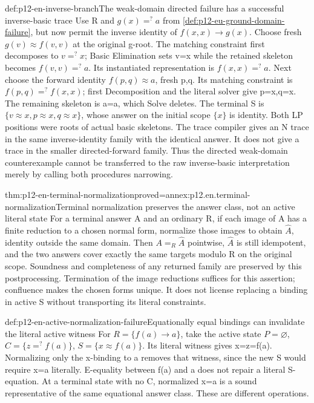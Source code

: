 \begin{hbexample}{def:p12-en-inverse-branch}{The weak-domain directed failure has a successful inverse-basic trace}
Use R and \(g(x)=^{?}a\) from
\cref{def:p12-eu-ground-domain-failure}, but now permit the inverse
identity of \(f(x,x)\to g(x)\). Choose fresh
\(g(v)\approx f(v,v)\) at the original g-root. The matching
constraint first decomposes to \(v=^{?}x\); Basic Elimination
sets v=x while the retained skeleton becomes \(f(v,v)=^{?}a\).
Its instantiated representation is \(f(x,x)=^{?}a\).
Next choose the forward identity \(f(p,q)\approx a\), fresh p,q.
Its matching constraint is \(f(p,q)=^{?}f(x,x)\); first
Decomposition and the literal solver give p=x,q=x. The remaining
skeleton is a=a, which Solve deletes. The terminal S is
\(\{v\approx x,p\approx x,q\approx x\}\), whose answer on
the initial scope \(\{x\}\) is identity. Both LP positions were
roots of actual basic skeletons. The trace compiler gives an N
trace in the same inverse-identity family with the identical answer.
It does not give a trace in the smaller directed-forward family.
Thus the directed weak-domain counterexample cannot be transferred
to the raw inverse-basic interpretation merely by calling both
procedures narrowing.
\end{hbexample}

\begin{hbtheorem}{thm:p12-en-terminal-normalization}{proved=annex:p12.en.terminal-normalization}{Terminal normalization preserves the answer class, not an active literal state}
For a terminal answer A and an ordinary R, if each image of A has
a finite reduction to a chosen normal form, normalize those images
to obtain \(\widehat A\), identity outside the same domain. Then
\(A=_R\widehat A\) pointwise, \(\widehat A\) is still idempotent,
and the two answers cover exactly the same targets modulo R on
the original scope. Soundness and completeness of any returned
family are preserved by this postprocessing. Termination of the
image reductions suffices for this assertion; confluence makes
the chosen forms unique. It does not license replacing a binding
in active S without transporting its literal constraints.
\end{hbtheorem}

\begin{hbexample}{def:p12-en-active-normalization-failure}{Equationally equal bindings can invalidate the literal active witness}
For \(R=\{f(a)\to a\}\), take the active state
\(P=\varnothing\), \(C=\{z=^{?}f(a)\}\),
\(S=\{x\approx f(a)\}\). Its literal witness gives
x=z=f(a). Normalizing only the x-binding to a removes that
witness, since the new S would require x=a literally. E-equality
between f(a) and a does not repair a literal S-equation. At a
terminal state with no C, normalized x=a is a sound representative
of the same equational answer class. These are different operations.
\end{hbexample}

